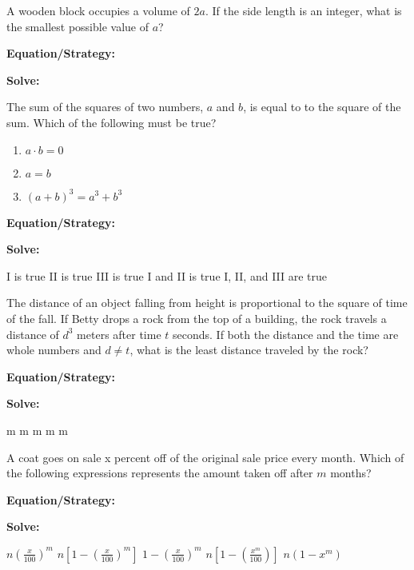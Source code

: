 \vfill
\newpage
\begin{multicols*}{2}
\begin{outline}[enumerate]
\medium

\1 A wooden block occupies a volume of $2a$. If the side length is an integer, what is the smallest possible value of $a$?

\bigskip
\textbf{Equation/Strategy:} \hrulefill

\bigskip
\textbf{Solve:}

\vfill
{}

\midline

\1 The sum of the squares of two numbers, $a$ and $b$, is equal to to the square of the sum. Which of the following must be true?

\begin{enumerate}[label=\Roman*.]
\item $a\cdot b=0$
\item $a=b$
\item $(a+b)^3=a^3+b^3$
\end{enumerate}

\bigskip
\textbf{Equation/Strategy:} \hrulefill

\bigskip
\textbf{Solve:}

\vfill
\2 I is true
\2 II is true
\2 III is true
\2 I and II is true
\2 I, II, and III are true

\columnbreak
\advanced

\1 The distance of an object falling from height is proportional to the square of time of the fall. If Betty drops a rock from the top of a building, the rock travels a distance of $d^3$ meters after time $t$ seconds. If both the distance and the time are whole numbers and $d\neq t$, what is the least distance traveled by the rock?

\bigskip
\textbf{Equation/Strategy:} \hrulefill

\bigskip
\textbf{Solve:}

\vfill
{} m
 m
 m
 m
 m

\midline

\1 A coat goes on sale x percent off of the original sale price every month. Which of the following expressions represents the amount taken off after $m$ months?

\bigskip
\textbf{Equation/Strategy:} \hrulefill

\bigskip
\textbf{Solve:}

\vfill
\2 $n\left(\frac{x}{100}\right)^m$
\2 $n\left[1-\left(\frac{x}{100}\right)^m\right]$
\2 $1-\left(\frac{x}{100}\right)^m$
\2 $n\left[1-\left(\frac{x^m}{100}\right)\right]$
\2 $n(1-x^m)$
\end{outline}
\end{multicols*}